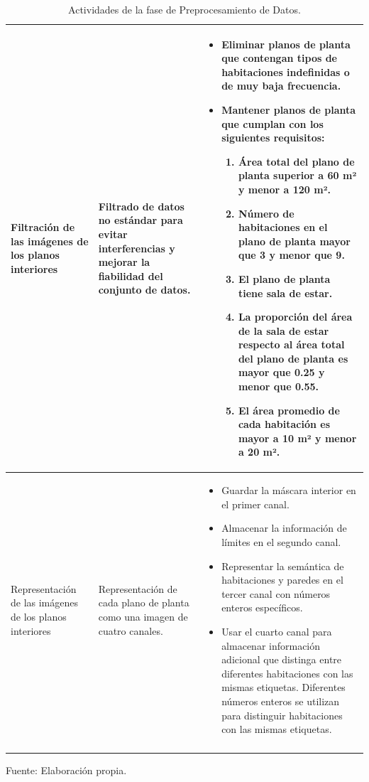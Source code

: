 \begin{longtable}{|p{3cm}|p{3cm}|p{9cm}|}
    Filtración de las imágenes de los planos interiores& Filtrado de datos no estándar para evitar interferencias y mejorar la fiabilidad del conjunto de datos. & 
    \begin{itemize}
        \item Eliminar planos de planta que contengan tipos de habitaciones indefinidas o de muy baja frecuencia.
        \item Mantener planos de planta que cumplan con los siguientes requisitos:
        \begin{enumerate}
            \item Área total del plano de planta superior a 60 m² y menor a 120 m².
            \item Número de habitaciones en el plano de planta mayor que 3 y menor que 9.
            \item El plano de planta tiene sala de estar.
            \item La proporción del área de la sala de estar respecto al área total del plano de planta es mayor que 0.25 y menor que 0.55.
            \item El área promedio de cada habitación es mayor a 10 m² y menor a 20 m².
        \end{enumerate}
    \end{itemize} \\
    \hline
    Representación de las imágenes de los planos interiores& Representación de cada plano de planta como una imagen de cuatro canales. & 
    \begin{itemize}
        \item Guardar la máscara interior en el primer canal.
        \item Almacenar la información de límites en el segundo canal.
        \item Representar la semántica de habitaciones y paredes en el tercer canal con números enteros específicos.
        \item Usar el cuarto canal para almacenar información adicional que distinga entre diferentes habitaciones con las mismas etiquetas. Diferentes números enteros se utilizan para distinguir habitaciones con las mismas etiquetas.
    \end{itemize} \\
    \hline
    \caption{Actividades de la fase de Preprocesamiento de Datos.}
    \label{tabla:actividades}
\end{longtable}


\begin{flushleft}	%
	\small Fuente: Elaboración propia.
\end{flushleft}


